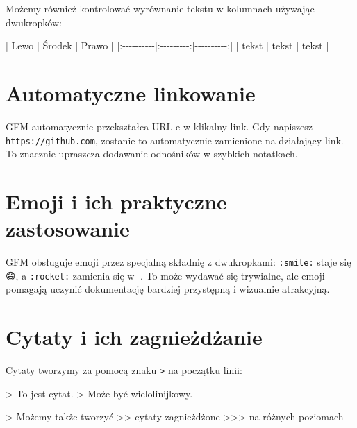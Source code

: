 \documentclass[
  polish,
  letterpaper,
  DIV=11,
  numbers=noendperiod]{scrreprt}
\newenvironment{Shaded}{\begin{snugshade}}{\end{snugshade}}
\newcommand{\AttributeTok}[1]{\textcolor[rgb]{0.40,0.45,0.13}{#1}}
\newcommand{\NormalTok}[1]{\textcolor[rgb]{0.00,0.23,0.31}{#1}}
\newcommand{\PreprocessorTok}[1]{\textcolor[rgb]{0.68,0.00,0.00}{#1}}
\begin{document}
Możemy również kontrolować wyrównanie tekstu w kolumnach używając
dwukropków:

\begin{Shaded}
\begin{Highlighting}[]
\PreprocessorTok{|}\NormalTok{ Lewo      }\PreprocessorTok{|}\NormalTok{ Środek    }\PreprocessorTok{|}\NormalTok{ Prawo     }\PreprocessorTok{|}
\PreprocessorTok{|:{-}{-}{-}{-}{-}{-}{-}{-}{-}{-}|:{-}{-}{-}{-}{-}{-}{-}{-}{-}:|{-}{-}{-}{-}{-}{-}{-}{-}{-}{-}:|}
\PreprocessorTok{|}\NormalTok{ tekst     }\PreprocessorTok{|}\NormalTok{ tekst     }\PreprocessorTok{|}\NormalTok{ tekst     }\PreprocessorTok{|}
\end{Highlighting}
\end{Shaded}

\section{Automatyczne linkowanie}\label{automatyczne-linkowanie}

GFM automatycznie przekształca URL-e w klikalny link. Gdy napiszesz
\texttt{https://github.com}, zostanie to automatycznie zamienione na
działający link. To znacznie upraszcza dodawanie odnośników w szybkich
notatkach.

\section{Emoji i ich praktyczne
zastosowanie}\label{emoji-i-ich-praktyczne-zastosowanie}

GFM obsługuje emoji przez specjalną składnię z dwukropkami:
\texttt{:smile:} staje się 😄, a \texttt{:rocket:} zamienia się w 🚀. To
może wydawać się trywialne, ale emoji pomagają uczynić dokumentację
bardziej przystępną i wizualnie atrakcyjną.

\section{Cytaty i ich
zagnieżdżanie}\label{cytaty-i-ich-zagnieux17cdux17canie}

Cytaty tworzymy za pomocą znaku \texttt{\textgreater{}} na początku
linii:

\begin{Shaded}
\begin{Highlighting}[]
\AttributeTok{\textgreater{} To jest cytat.}
\AttributeTok{\textgreater{} Może być wielolinijkowy.}

\AttributeTok{\textgreater{} Możemy także tworzyć}
\AttributeTok{\textgreater{}\textgreater{} cytaty zagnieżdżone}
\AttributeTok{\textgreater{}\textgreater{}\textgreater{} na różnych poziomach}
\end{Highlighting}
\end{Shaded}
\end{document}
